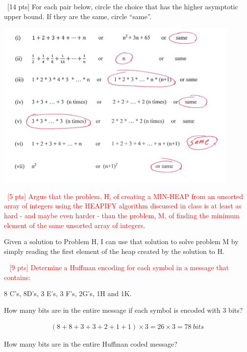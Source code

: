 \documentclass[12pt]{article}
\newenvironment{sol}[1][Solution]{\begin{trivlist}\item[\hskip\labelsep {\bfseries #1:}]}{\end{trivlist}}
\begin{document}
\begin{enumerate}
    \item \ [14 pts] For each pair below, circle the choice that has the higher asymptotic upper bound. If they are the same, circle “same”.
    \begin{sol}
                 \begin{center}
            \includegraphics[width = 0.9\textwidth]{p1.png}
    \end{center}
    \end{sol}

    \item \ \textcolor{red}{[5 pts] Argue that the problem, H, of creating a MIN-HEAP from an unsorted array of integers using the HEAPIFY algorithm discussed in class is at least as hard - and maybe even harder - than the problem, M, of finding the minimum element of the same unsorted array of integers.}
    \begin{sol}
        Given a solution to Problem H, I can use that solution to solve problem M by simply reading the first element of the heap created by the solution to H.
    \end{sol}

    \item \ \textcolor{red}{ [9 pts] Determine a Huffman encoding for each symbol in a message that contains:}
    \begin{center}
        8 C's, 8D's, 3 E's, 3 F's, 2G's, 1H and 1K.
    \end{center}
    \begin{enumerate}
        \item How many bits are in the entire message if each symbol is encoded with 3 bits? 
        \begin{sol}
        \begin{align*}
            (8 + 8 + 3 + 3 + 2 + 1+ 1) \times 3 = 26 \times 3 = 78 \ bits
        \end{align*}
        \end{sol}
        \item How many bits are in the entire Huffman coded message?


\end{enumerate}
\end{enumerate}
\end{document}
